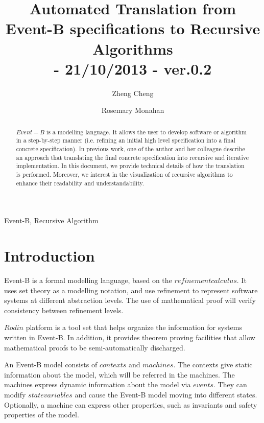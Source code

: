 \documentclass{easychair}
\newenvironment{keywords}{
       \list{}{\advance\topsep by0.35cm\relax\small
       \leftmargin=1cm
       \labelwidth=0.35cm
       \listparindent=0.35cm
       \itemindent\listparindent
       \rightmargin\leftmargin}\item[\hskip\labelsep
                                     \bfseries Keywords:]}
     {\endlist}
\begin{document}
\pagestyle{plain}

\title{Automated Translation from Event-B specifications to Recursive Algorithms
\\\small{- 21/10/2013 - ver.0.2} 
}
\author{
Zheng Cheng \and
Rosemary Monahan 
}


\maketitle  

\begin{abstract}
$Event-B$ is a modelling language. It allows the user to develop software or algorithm in a step-by-step manner (i.e. refining an initial high level specification into a final concrete specification). In previous work, one of the author and her colleague describe an approach that translating the final concrete specification into recursive and iterative implementation. In this document, we provide technical details of how the translation is performed. Moreover, we interest in the visualization of recursive algorithms to enhance their readability and understandability.
 
\end{abstract}   

\begin{keywords}
 Event-B,
 Recursive Algorithm
\end{keywords}

\section{Introduction} %
Event-B is a formal modelling language, based on the $refinement calculus$. It uses set theory as a modelling notation, and use refinement to represent software systems at different abstraction levels. The use of mathematical proof will verify consistency between refinement levels.

$Rodin$ platform is a tool set that helps organize the information for systems written in Event-B. In addition, it provides theorem proving facilities that allow mathematical proofs to be semi-automatically discharged.

An Event-B model consists of $contexts$ and $machines$. The contexts give static information about the model, which will be referred in the machines. The machines express dynamic information about the model via $events$. They can modify $state variables$ and cause the Event-B model moving into different states. Optionally, a machine can express other properties, such as invariants and safety properties of the model.
\end{document}

